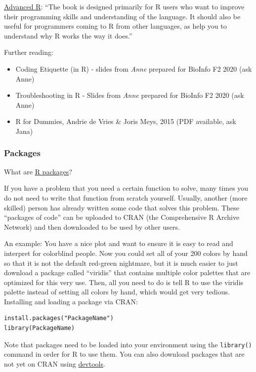 \documentclass[
]{book}
\begin{document}
\href{https://adv-r.hadley.nz/}{Advanced R}: ``The book is designed primarily
for R users who want to improve their programming skills and
understanding of the language. It should also be useful for programmers
coming to R from other languages, as help you to understand why R works
the way it does.''

Further reading:

\begin{itemize}
\item
  Coding Etiquette (in R) - slides from \emph{Anne} prepared for BioInfo F2
  2020 (ask Anne)
\item
  Troubleshooting in R - Slides from \emph{Anne} prepared for BioInfo F2
  2020 (ask Anne)
\item
  R for Dummies, Andrie de Vries \& Joris Meys, 2015 (PDF available,
  ask Jana)
\end{itemize}

\subsubsection{Packages}\label{packages}

What are \href{https://r-pkgs.org/}{R packages}?

If you have a problem that you need a certain function to solve, many
times you do not need to write that function from scratch yourself.
Usually, another (more skilled) person has already written some code
that solves this problem. These ``packages of code'' can be uploaded to
CRAN (the Comprehensive R Archive Network) and then downloaded to be
used by other users.

An example: You have a nice plot and want to ensure it is easy to read
and interpret for colorblind people. Now you could set all of your 200
colors by hand so that it is not the default red-green nightmare, but it
is much easier to just download a package called ``viridis'' that contains
multiple color palettes that are optimized for this very use. Then, all
you need to do is tell R to use the viridis palette instead of setting
all colors by hand, which would get very tedious. Installing and loading
a package via CRAN:

\begin{verbatim}
install.packages("PackageName")
library(PackageName)
\end{verbatim}

Note that packages need to be loaded into your environment using the
\texttt{library()} command in order for R to use them. You can also download
packages that are not yet on CRAN using
\href{https://www.r-project.org/nosvn/pandoc/devtools.html}{devtools}.
\end{document}
